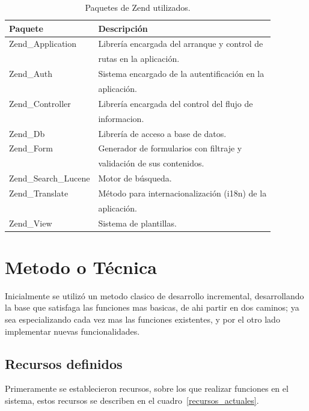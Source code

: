\documentclass[letter,12pt]{article}
\begin{document}
\begin{table}
\begin{tabular}{l|l}
Paquete & Descripción \\
\hline
Zend\_Application     & Librería encargada del arranque y control de    \\
					  & rutas en la aplicación. \\
Zend\_Auth            & Sistema encargado de la autentificación en la   \\
					  & aplicación. \\
Zend\_Controller      & Librería encargada del control del flujo de     \\
				      & informacion. \\
Zend\_Db              & Librería de acceso a base de datos. \\
Zend\_Form            & Generador de formularios con filtraje y         \\
					  & validación de sus contenidos. \\
Zend\_Search\_Lucene  & Motor de búsqueda. \\
Zend\_Translate       & Método para internacionalización (i18n) de la   \\
				      & aplicación. \\
Zend\_View            & Sistema de plantillas. \\
\end{tabular}
\caption{Paquetes de Zend utilizados.}
\label{herramientas_zend}
\end{table}

\section{Metodo o Técnica}
Inicialmente se utilizó un metodo clasico de desarrollo incremental, de\-sa\-rro\-llan\-do la
base que satisfaga las funciones mas basicas, de ahi partir en dos caminos; ya sea especializando
cada vez mas las funciones existentes, y por el otro lado implementar nuevas funcionalidades.

\subsection{Recursos definidos}
Primeramente se establecieron recursos, sobre los que realizar funciones en el sistema, estos
recursos se describen en el cuadro~\ref{recursos_actuales}.
\end{document}
